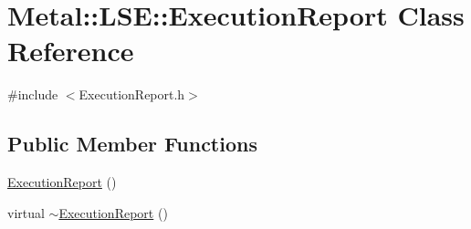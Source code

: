 \hypertarget{classMetal_1_1LSE_1_1ExecutionReport}{}\section{Metal\+:\+:L\+S\+E\+:\+:Execution\+Report Class Reference}
\label{classMetal_1_1LSE_1_1ExecutionReport}


{\ttfamily \#include $<$Execution\+Report.\+h$>$}

\subsection*{Public Member Functions}
\begin{DoxyCompactItemize}
\item 
\hyperlink{classMetal_1_1LSE_1_1ExecutionReport_aa6982514c3408004ba864377259775e0}{Execution\+Report} ()
\item 
virtual \hyperlink{classMetal_1_1LSE_1_1ExecutionReport_aefb6a296e2bdbd963e63e1c56243f36e}{$\sim$\+Execution\+Report} ()
\end{DoxyCompactItemize}
